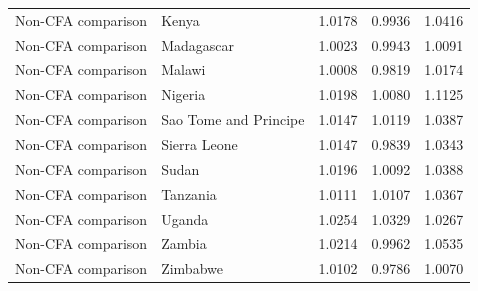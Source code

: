 \begin{table}
\begin{tabular}[t]{llrrr}
Non-CFA comparison & Kenya & 1.0178 & 0.9936 & 1.0416\\
\addlinespace
Non-CFA comparison & Madagascar & 1.0023 & 0.9943 & 1.0091\\
Non-CFA comparison & Malawi & 1.0008 & 0.9819 & 1.0174\\
Non-CFA comparison & Nigeria & 1.0198 & 1.0080 & 1.1125\\
Non-CFA comparison & Sao Tome and Principe & 1.0147 & 1.0119 & 1.0387\\
Non-CFA comparison & Sierra Leone & 1.0147 & 0.9839 & 1.0343\\
\addlinespace
Non-CFA comparison & Sudan & 1.0196 & 1.0092 & 1.0388\\
Non-CFA comparison & Tanzania & 1.0111 & 1.0107 & 1.0367\\
Non-CFA comparison & Uganda & 1.0254 & 1.0329 & 1.0267\\
Non-CFA comparison & Zambia & 1.0214 & 0.9962 & 1.0535\\
Non-CFA comparison & Zimbabwe & 1.0102 & 0.9786 & 1.0070\\
\bottomrule
\end{tabular}
\end{table}
